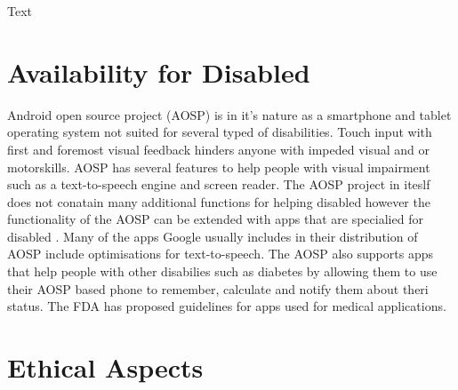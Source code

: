 \documentclass[conference]{IEEEtran}
\begin{document}
{Text}


\section{Availability for Disabled}
\label{availability}



Android open source project (AOSP) is in it's nature as a smartphone and tablet operating system not suited for several typed of disabilities. Touch input with first and foremost visual feedback hinders anyone with impeded visual and or motorskills. AOSP has several features to help people with visual impairment such as a text-to-speech engine and screen reader\cite{android-disabled-help}. The AOSP project in iteslf does not conatain many additional functions for helping disabled however the functionality of the AOSP can be extended with apps that are specialied for disabled \cite{android-disabled-apps}. Many of the apps Google usually includes in their distribution of AOSP include optimisations for text-to-speech\cite{android-disabled-help}. The AOSP also supports apps that help people with other disabilies such as diabetes\cite{android-disabled-diabetes} by allowing them to use their AOSP based phone to remember, calculate and notify them about theri status. The FDA has proposed guidelines for apps used for medical applications\cite{android-disabled-FDA}.



\section{Ethical Aspects}
\label{ethics}
\end{document}
